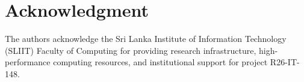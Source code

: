 \documentclass[conference]{IEEEtran}
\begin{document}
\section*{Acknowledgment}
The authors acknowledge the Sri Lanka Institute of Information Technology (SLIIT) Faculty of Computing for providing research infrastructure, high-performance computing resources, and institutional support for project R26-IT-148.



\end{document}
